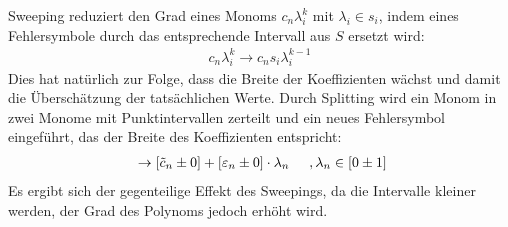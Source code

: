Sweeping reduziert den Grad eines Monoms $c_n \lambda_i^k$ mit $\lambda_i \in s_i$, indem eines Fehlersymbole durch das entsprechende Intervall aus $S$ ersetzt wird: 
\begin{align*}
 c_n \lambda_i^k \rightarrow c_n s_i \lambda_i^{k-1}
\end{align*}
Dies hat natürlich zur Folge, dass die Breite der Koeffizienten wächst und damit die Überschätzung der tatsächlichen Werte. Durch Splitting wird ein Monom in zwei Monome mit Punktintervallen zerteilt und ein neues Fehlersymbol eingeführt, das der Breite des Koeffizienten entspricht:
\begin{align*}
 [\tilde{c}_n \pm \varepsilon_n]\ \rightarrow [\tilde{c}_n \pm 0] + [\varepsilon_n \pm 0]\cdot  \lambda_n \hspace{0.5cm}, \lambda_n \in [0 \pm 1]
\end{align*}
Es ergibt sich der gegenteilige Effekt des Sweepings, da die Intervalle kleiner werden, der Grad des Polynoms jedoch erhöht wird.









 

